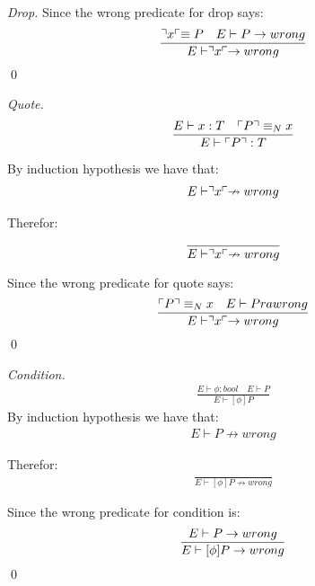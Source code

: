\begin{theorem}
\begin{proof}[Drop]
        Since the wrong predicate for drop says:
        \begin{align*}
            \frac{\urcorner x \ulcorner \equiv P \quad E \vdash P \rightarrow wrong}{E \vdash \urcorner x \ulcorner \rightarrow wrong}
        \end{align*}
        \qed
    \end{proof}

    \begin{proof}[Quote]
        \begin{align*}
            \frac{E \vdash x:T \quad \ulcorner P \urcorner \equiv _N x}{E \vdash \ulcorner P \urcorner:T}
        \end{align*}

        By induction hypothesis we have that:
        \begin{align*}
            E \vdash \urcorner x \ulcorner \nrightarrow wrong
        \end{align*}

        Therefor:
        \begin{align*}
            \frac{}{E \vdash \urcorner x \ulcorner \nrightarrow wrong}
        \end{align*}

        Since the wrong predicate for quote says:
        \begin{align*}
            \frac{\ulcorner P \urcorner \equiv _N x \quad E \vdash P ra wrong}{E \vdash \urcorner x \ulcorner \rightarrow wrong}
        \end{align*}
        \qed
    \end{proof}

    \begin{proof}[Condition]
        \begin{align*}
            \frac{E \vdash \phi : bool \quad E \vdash P}{E \vdash [\phi]P}
        \end{align*}
        By induction hypothesis we have that:
        \begin{align*}
            E \vdash P \nrightarrow wrong
        \end{align*}

        Therefor:
        \begin{align*}
            \frac{}{E \vdash [\phi ]P \nrightarrow wrong}
        \end{align*}

        Since the wrong predicate for condition is:
        \begin{align*}
            \frac{E \vdash P \rightarrow wrong}{E \vdash [\phi ]P \rightarrow wrong}
        \end{align*}
        \qed
    \end{proof}
\end{theorem}






